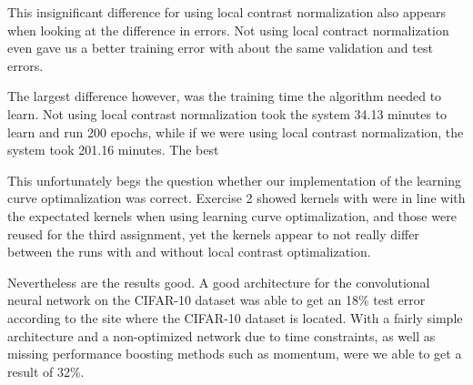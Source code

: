 This insignificant difference for using local contrast normalization also appears when looking at the difference in errors. Not using local contract normalization even gave us a better training error with about the same validation and test errors. 

The largest difference however, was the training time the algorithm needed to learn. Not using local contrast normalization took the system 34.13 minutes to learn and run 200 epochs, while if we were using local contrast normalization, the system took 201.16 minutes. The best

This unfortunately begs the question whether our implementation of the learning curve optimalization was correct. Exercise 2 showed kernels with were in line with the expectated kernels when using learning curve optimalization, and those were reused for the third assignment, yet the kernels appear to not really differ between the runs with and without local contrast optimalization.

Nevertheless are the results good. A good architecture for the convolutional neural network on the CIFAR-10 dataset was able to get an 18\% test error according to the site where the CIFAR-10 dataset is located. With a fairly simple architecture and a non-optimized network due to time constraints, as well as missing performance boosting methods such as momentum, were we able to get a result of 32\%.
